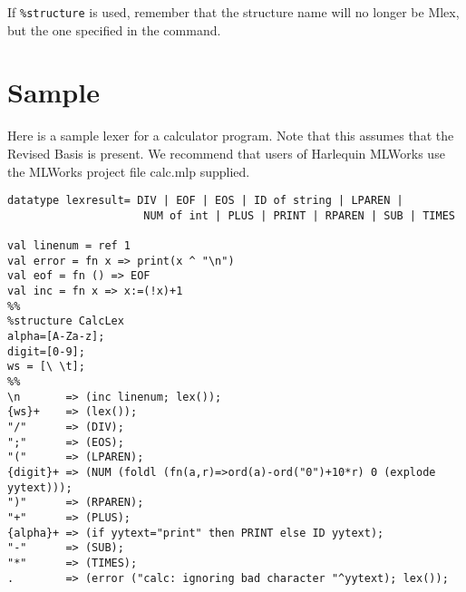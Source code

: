 \documentclass{article}
\begin{document}
If {\tt \%structure} is used, remember that the structure name will no
longer be Mlex, but the one specified in the command.

\section{Sample}

Here is a sample lexer for a calculator program.  Note that this
assumes that the Revised Basis is present.
We recommend that users of Harlequin MLWorks use the MLWorks 
project file calc.mlp supplied.

\small
\begin{verbatim}
datatype lexresult= DIV | EOF | EOS | ID of string | LPAREN |
                     NUM of int | PLUS | PRINT | RPAREN | SUB | TIMES 

val linenum = ref 1
val error = fn x => print(x ^ "\n")
val eof = fn () => EOF
val inc = fn x => x:=(!x)+1
%%
%structure CalcLex
alpha=[A-Za-z];
digit=[0-9];
ws = [\ \t];
%%
\n       => (inc linenum; lex());
{ws}+    => (lex());
"/"      => (DIV);
";"      => (EOS);
"("      => (LPAREN);
{digit}+ => (NUM (foldl (fn(a,r)=>ord(a)-ord("0")+10*r) 0 (explode yytext)));
")"      => (RPAREN);
"+"      => (PLUS);
{alpha}+ => (if yytext="print" then PRINT else ID yytext);
"-"      => (SUB);
"*"      => (TIMES);
.        => (error ("calc: ignoring bad character "^yytext); lex());
\end{verbatim}
\end{document}
